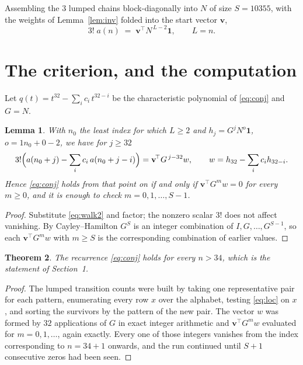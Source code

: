 \documentclass[11pt,a4paper]{article}
\theoremstyle{plain}
\newtheorem{theorem}{Theorem}
\newtheorem{lemma}[theorem]{Lemma}
\theoremstyle{definition}
\begin{document}
Assembling the $3$ lumped chains block-diagonally into $N$ of size $S=10355$, with the
weights of Lemma~\ref{lem:inv} folded into the start vector $\mathbf{v}$,
\begin{equation}\label{eq:walk2}
3!\;a(n)\;=\;\mathbf{v}^{\!\top}N^{\,L-2}\mathbf{1},\qquad L=n .
\end{equation}

\section{The criterion, and the computation}

Let $q(t)=t^{32}-\sum_i c_i\,t^{32-i}$ be the characteristic polynomial of
\eqref{eq:conj} and $G=N$.

\begin{lemma}\label{lem:crit}
With $n_0$ the least index for which $L\ge2$ and $h_j=G^{j}N^{o}\mathbf{1}$,
$o=1n_0+0-2$, we have for $j\ge32$
\[
3!\Bigl(a(n_0+j)-\sum_i c_i\,a(n_0+j-i)\Bigr)
=\mathbf{v}^{\!\top}G^{\,j-32}w,\qquad
w=h_{32}-\sum_i c_i h_{32-i} .
\]
Hence \eqref{eq:conj} holds from that point on if and only if
$\mathbf{v}^{\!\top}G^{m}w=0$ for every $m\ge0$, and it is enough to check
$m=0,1,\dots,S-1$.
\end{lemma}

\begin{proof}
Substitute \eqref{eq:walk2} and factor; the nonzero scalar $3!$ does not affect
vanishing. By Cayley--Hamilton $G^{S}$ is an integer combination of $I,G,\dots,G^{S-1}$,
so each $\mathbf{v}^{\!\top}G^{m}w$ with $m\ge S$ is the corresponding combination of
earlier values.
\end{proof}

\begin{theorem}
The recurrence \eqref{eq:conj} holds for every $n>34$, which is the statement of
Section~1.
\end{theorem}

\begin{proof}
The lumped transition counts were built by taking one representative pair for each pattern,
enumerating every row $x$ over the alphabet, testing \eqref{eq:loc} on $x$, and sorting
the survivors by the pattern of the new pair. The vector $w$ was formed by $32$
applications of $G$ in exact integer arithmetic and $\mathbf{v}^{\!\top}G^{m}w$
evaluated for $m=0,1,\dots$, again exactly. Every one of those integers vanishes from the
index corresponding to $n=34+1$ onwards, and the run continued until $S+1$ consecutive
zeros had been seen.
\end{proof}
\end{document}
